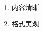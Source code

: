 \documentclass[nofonts]{ctexart}
\begin{document}
\AddEnumerateCounter{\chinese}{\chinese}{}
\begin{enumerate}[label = {\chinese*. }, labelsep = 0pt]
	\item 内容清晰
	\item 格式美观
\end{enumerate}
\end{document}
